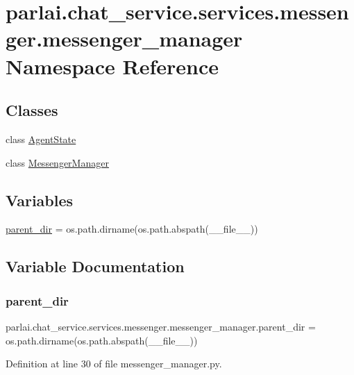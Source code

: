 \hypertarget{namespaceparlai_1_1chat__service_1_1services_1_1messenger_1_1messenger__manager}{}\section{parlai.\+chat\+\_\+service.\+services.\+messenger.\+messenger\+\_\+manager Namespace Reference}
\label{namespaceparlai_1_1chat__service_1_1services_1_1messenger_1_1messenger__manager}
\subsection*{Classes}
\begin{DoxyCompactItemize}
\item 
class \hyperlink{classparlai_1_1chat__service_1_1services_1_1messenger_1_1messenger__manager_1_1AgentState}{Agent\+State}
\item 
class \hyperlink{classparlai_1_1chat__service_1_1services_1_1messenger_1_1messenger__manager_1_1MessengerManager}{Messenger\+Manager}
\end{DoxyCompactItemize}
\subsection*{Variables}
\begin{DoxyCompactItemize}
\item 
\hyperlink{namespaceparlai_1_1chat__service_1_1services_1_1messenger_1_1messenger__manager_abfde7568d777b41aafdc401a1324c965}{parent\+\_\+dir} = os.\+path.\+dirname(os.\+path.\+abspath(\+\_\+\+\_\+file\+\_\+\+\_\+))
\end{DoxyCompactItemize}


\subsection{Variable Documentation}
\mbox{\label{namespaceparlai_1_1chat__service_1_1services_1_1messenger_1_1messenger__manager_abfde7568d777b41aafdc401a1324c965}} 
\subsubsection{\texorpdfstring{parent\+\_\+dir}{parent\_dir}}
{\footnotesize\ttfamily parlai.\+chat\+\_\+service.\+services.\+messenger.\+messenger\+\_\+manager.\+parent\+\_\+dir = os.\+path.\+dirname(os.\+path.\+abspath(\+\_\+\+\_\+file\+\_\+\+\_\+))}



Definition at line 30 of file messenger\+\_\+manager.\+py.

